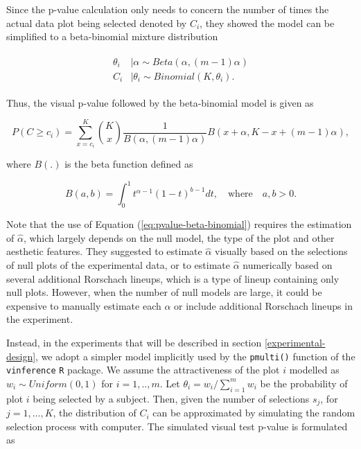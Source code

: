 \documentclass[]{interact}
\theoremstyle{plain}%
\theoremstyle{definition}
\theoremstyle{remark}
\begin{document}
Since the p-value calculation only needs to concern the number of times
the actual data plot being selected denoted by \(C_i\), they showed the
model can be simplified to a beta-binomial mixture distribution

\begin{align} \label{eq:beta-binomial}\begin{split}
\theta_i&|\alpha \sim Beta(\alpha, (m-1)\alpha)\\
C_i&|\theta_i \sim Binomial(K, \theta_i).
\end{split}\end{align}

Thus, the visual p-value followed by the beta-binomial model is given as

\begin{equation} \label{eq:pvalue-beta-binomial}
P(C \geq c_i) = \sum_{x=c_i}^{K}{{K}\choose{x}}\frac{1}{B(\alpha, (m-1)\alpha)}B(x + \alpha, K - x + (m - 1)\alpha),
\end{equation}

where \(B(.)\) is the beta function defined as

\begin{equation} \label{eq:betafunction}
B(a, b) = \int_{0}^{1}t^{\alpha - 1}(1-t)^{b-1}dt,\quad \text{where}\quad a,b>0. 
\end{equation}

Note that the use of Equation (\ref{eq:pvalue-beta-binomial}) requires
the estimation of \(\hat{\alpha}\), which largely depends on the null
model, the type of the plot and other aesthetic features. They suggested
to estimate \(\hat{\alpha}\) visually based on the selections of null
plots of the experimental data, or to estimate \(\hat{\alpha}\)
numerically based on several additional Rorschach lineups, which is a
type of lineup containing only null plots. However, when the number of
null models are large, it could be expensive to manually estimate each
\(\alpha\) or include additional Rorschach lineups in the experiment.

Instead, in the experiments that will be described in section
\ref{experimental-design}, we adopt a simpler model implicitly used by
the \texttt{pmulti()} function of the \texttt{vinference} \texttt{R}
package. We assume the attractiveness of the plot \(i\) modelled as
\(w_i \sim Uniform(0,1)\) for \(i=1,..,m\). Let
\(\theta_i = w_i/\sum_{i=1}^{m}w_i\) be the probability of plot \(i\)
being selected by a subject. Then, given the number of selections
\(s_j\), for \(j=1,...,K\), the distribution of \(C_i\) can be
approximated by simulating the random selection process with computer.
The simulated visual test p-value is formulated as
\end{document}
